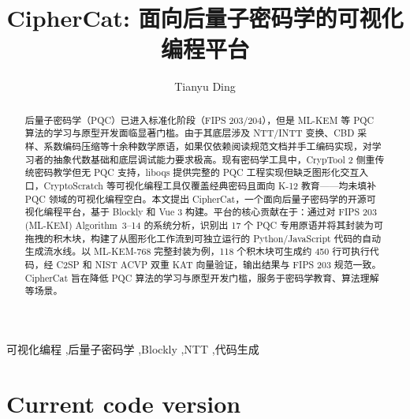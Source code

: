 \documentclass[preprint,12pt,a4paper]{elsarticle}
\begin{document}
\renewcommand{\labelenumii}{\arabic{enumi}.\arabic{enumii}}

\begin{frontmatter}

	\title{CipherCat: 面向后量子密码学的可视化编程平台}

	\author{Tianyu Ding}

	\address{Department of Electronic and Communication Engineering, Beijing Electronic Science and Technology Institute, Beijing, 100070, China}

	\begin{abstract}
		后量子密码学（PQC）已进入标准化阶段（FIPS 203/204），但是 ML-KEM 等 PQC 算法的学习与原型开发面临显著门槛。由于其底层涉及 NTT/INTT 变换、CBD 采样、系数编码压缩等十余种数学原语，如果仅依赖阅读规范文档并手工编码实现，对学习者的抽象代数基础和底层调试能力要求极高。现有密码学工具中，CrypTool 2 侧重传统密码教学但无 PQC 支持，liboqs 提供完整的 PQC 工程实现但缺乏图形化交互入口，CryptoScratch 等可视化编程工具仅覆盖经典密码且面向 K-12 教育——均未填补 PQC 领域的可视化编程空白。本文提出 CipherCat，一个面向后量子密码学的开源可视化编程平台，基于 Blockly 和 Vue 3 构建。平台的核心贡献在于：通过对 FIPS 203 (ML-KEM) Algorithm~3--14 的系统分析，识别出 17 个 PQC 专用原语并将其封装为可拖拽的积木块，构建了从图形化工作流到可独立运行的 Python/JavaScript 代码的自动生成流水线。以 ML-KEM-768 完整封装为例，118 个积木块可生成约 450 行可执行代码，经 C2SP 和 NIST ACVP 双重 KAT 向量验证，输出结果与 FIPS 203 规范一致。CipherCat 旨在降低 PQC 算法的学习与原型开发门槛，服务于密码学教育、算法理解等场景。
	\end{abstract}

	\begin{keyword}
		可视化编程 \sep 后量子密码学 \sep Blockly \sep NTT \sep 代码生成
	\end{keyword}

\end{frontmatter}


\section*{Current code version}
\label{sec:codeversion}
\end{document}
